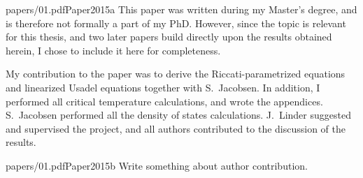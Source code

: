 \begin{paper}{papers/01.pdf}{Paper2015a}
  This paper was written during my Master's degree, and is therefore not formally a part of my PhD.
  However, since the topic is relevant for this thesis, and two later papers build directly upon the results obtained herein, I chose to include it here for completeness.

  My contribution to the paper was to derive the Riccati-parametrized equations and linearized Usadel equations together with S.~Jacobsen.
  In addition, I performed all critical temperature calculations, and wrote the appendices.
  S.~Jacobsen performed all the density of states calculations.
  J.~Linder suggested and supervised the project, and all authors contributed to the discussion of the results.
\end{paper}

\begin{paper}{papers/01.pdf}{Paper2015b}
  Write something about author contribution.
\end{paper}
